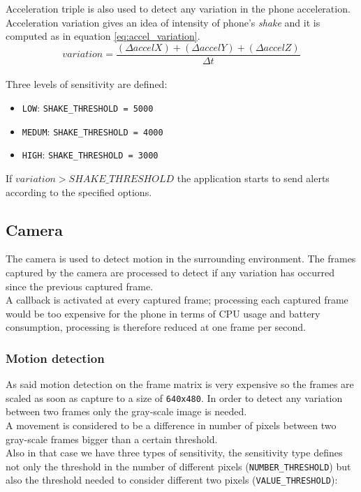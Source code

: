 \documentclass[conference, 11pt]{IEEEtran}
\begin{document}
Acceleration triple is also used to detect any variation in the phone acceleration. Acceleration variation gives an idea of intensity of phone's \textit{shake} and it is computed as in equation \ref{eq:accel_variation}.\\

\begin{equation}
variation = \frac{(\Delta accelX)+(\Delta accelY)+(\Delta accelZ)}{\Delta t}
\label{eq:accel_variation}
\end{equation}
\vspace{.5cm}\\
Three levels of sensitivity are defined:
\begin{itemize}
	\item \texttt{LOW}: \texttt{SHAKE\_THRESHOLD = 5000}
	\item \texttt{MEDUM}:  \texttt{SHAKE\_THRESHOLD = 4000}
	\item \texttt{HIGH}:  \texttt{SHAKE\_THRESHOLD = 3000}
\end{itemize}

If $variation>SHAKE\_THRESHOLD$ the application starts to send alerts according to the specified options.

\subsection{\textbf{Camera}}
The camera is used to detect motion in the surrounding environment. The frames captured by the camera are processed to detect if any variation has occurred since the previous captured frame.\\
A callback is activated at every captured frame; processing each captured frame would be too expensive for the phone in terms of CPU usage and battery consumption, processing is therefore reduced at one frame per second.\\
\subsubsection{\textbf{Motion detection}}
As said motion detection on the frame matrix is very expensive so the frames are scaled as soon as capture to a size of \texttt{640x480}. In order to detect any variation between two frames only the gray-scale image is needed.\\
A movement is considered to be a difference in number of pixels between two gray-scale frames bigger than a certain threshold.\\
Also in that case we have three types of sensitivity, the sensitivity type defines not only the threshold in the number of different pixels (\texttt{NUMBER\_THRESHOLD}) but also the threshold needed to consider different two pixels (\texttt{VALUE\_THRESHOLD}):\\
\end{document}

